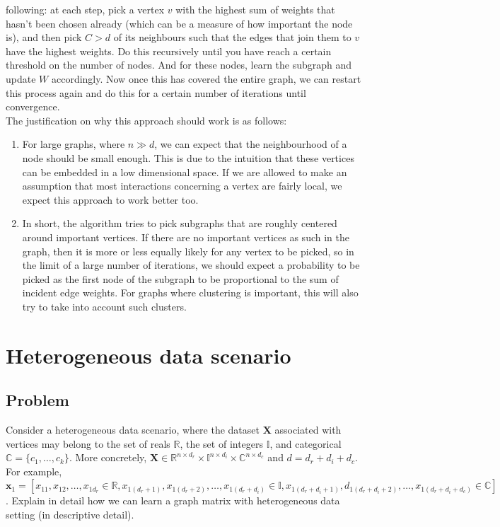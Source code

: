 \documentclass[a4paper]{article}
\newcommand{\nl}{\vspace{0.2cm}\\}
\newcommand{\mf}{\mathbf}
\newcommand{\mb}{\mathbb}
\newcommand{\R}{\mathbb{R}}
\begin{document}
following: at each step, pick a vertex $v$ with the highest sum of weights that hasn't been chosen already (which can be a measure of how important the node is), and then pick $C > d$ of its neighbours such that the edges that join
them to $v$ have the highest weights. Do this recursively until you have reach a certain threshold on the number of nodes. And for these nodes, learn the subgraph and update $W$ accordingly. Now
once this has covered the entire graph, we can restart this process again and do this for a certain number of iterations until convergence.\nl
The justification on why this approach should work is as follows:
\begin{enumerate}
    \item For large graphs, where $n \gg d$, we can expect that the neighbourhood of a node should be small enough. This is due to the intuition that these vertices can be embedded in a low
        dimensional space. If we are allowed to make an assumption that most interactions concerning a vertex are fairly local, we expect this approach to work better too.
    \item In short, the algorithm tries to pick subgraphs that are roughly centered around important vertices. If there are no important vertices as such in the graph, then it is more or less equally
        likely for any vertex to be picked, so in the limit of a large number of iterations, we should expect a probability to be picked as the first node of the subgraph to be proportional
        to the sum of incident edge weights. For graphs where clustering is important, this will also try to take into account such clusters.
\end{enumerate}


\newpage

\section{Heterogeneous data scenario}

\subsection{Problem}

Consider a heterogeneous data scenario, where the dataset $\mf{X}$ associated with vertices may belong to the set of reals $\R$, the set of integers $\mb{I}$, and categorical $\mb{C} = \{c_1,
\ldots, c_k\}$. More concretely, $\mf{X} \in \R^{n \times d_r} \times \mb{I}^{n \times d_i} \times \mb{C}^{n \times d_c}$ and $d = d_r + d_i + d_c$. For example, $\mf{x}_1 = [x_{11}, x_{12},
\ldots, x_{1d_r} \in \R, x_{1(d_r + 1)}, x_{1(d_r + 2)}, \ldots, x_{1(d_r + d_i)} \in \mb{I}, x_{1(d_r + d_i + 1)}, d_{1(d_r + d_i + 2)}, \ldots, x_{1(d_r + d_i + d_c)} \in \mb{C}]$. Explain in
detail how we can learn a graph matrix with heterogeneous data setting (in descriptive detail).
\end{document}
